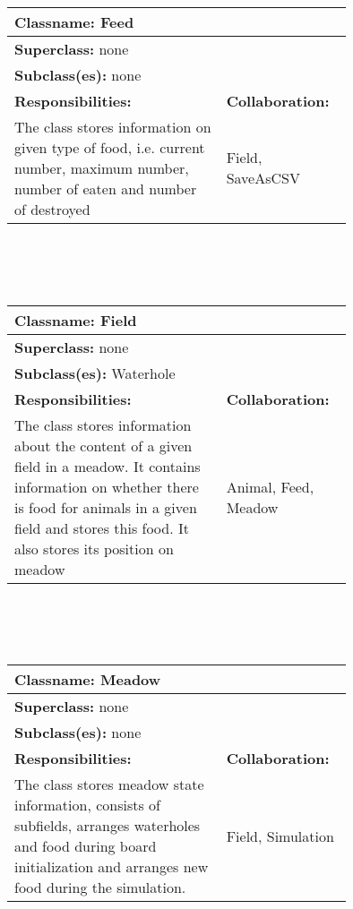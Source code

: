 \documentclass{article}
\begin{document}
\\ \\ \\
\begin{tabular}{|p{0.55\linewidth}|p{0.2\linewidth}|}
\hline
\multicolumn{2}{|l|}{\textbf{Classname:} Feed} \\
\hline
\multicolumn{2}{|l|}{\textbf{Superclass:} none} \\
\multicolumn{2}{|l|}{\textbf{Subclass(es):} none} \\
\hline
\textbf{Responsibilities:}  &  \textbf{Collaboration:} \\
The class stores information on given type of food, i.e. current number, maximum number, number of eaten and number of destroyed & Field, SaveAsCSV \\
\hline
\end{tabular}
\\ \\ \\
\begin{tabular}{|p{0.55\linewidth}|p{0.2\linewidth}|}
\hline
\multicolumn{2}{|l|}{\textbf{Classname:} Field} \\
\hline
\multicolumn{2}{|l|}{\textbf{Superclass:} none} \\
\multicolumn{2}{|l|}{\textbf{Subclass(es):} Waterhole} \\
\hline
\textbf{Responsibilities:}  &  \textbf{Collaboration:} \\
The class stores information about the content of a given field in a meadow. It contains information on whether there is food for animals in a given field and stores this food. It also stores its position on meadow & Animal, Feed, Meadow\\
\hline
\end{tabular}
\\ \\ \\
\begin{tabular}{|p{0.55\linewidth}|p{0.2\linewidth}|}
\hline
\multicolumn{2}{|l|}{\textbf{Classname:} Meadow} \\
\hline
\multicolumn{2}{|l|}{\textbf{Superclass:} none} \\
\multicolumn{2}{|l|}{\textbf{Subclass(es):} none} \\
\hline
\textbf{Responsibilities:}  &  \textbf{Collaboration:} \\
The class stores meadow state information, consists of subfields, arranges waterholes and food during board initialization and arranges new food during the simulation. & Field, Simulation \\
\hline
\end{tabular}
\end{document}
